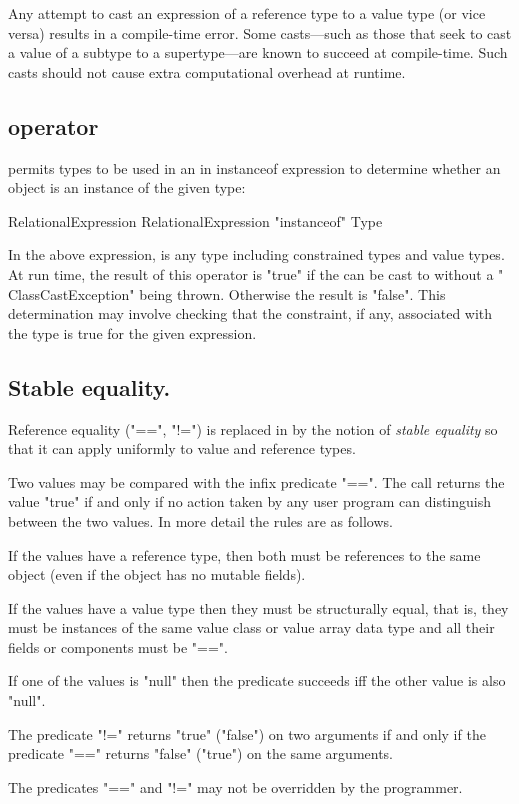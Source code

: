 Any attempt to cast an expression of a reference type to a value type
(or vice versa) results in a compile-time error. Some casts---such as
those that seek to cast a value of a subtype to a supertype---are
known to succeed at compile-time. Such casts should not cause extra
computational overhead at runtime.

\subsection{ operator}\label{instanceOf}

\Xten{} permits types to be used in an in instanceof expression
to determine whether an object is an instance of the given type:

\begin{grammar}
RelationalExpression \: RelationalExpression \xcd"instanceof" Type
\end{grammar}

In the above expression,  is any type including
constrained types and value types. 
At run time, the result of this operator is
\xcd"true" if the  can be cast
to  without a \xcd" ClassCastException" being
thrown.  Otherwise the result is \xcd"false".
This determination may involve checking
that the
constraint, if any, associated with the type is true for the
given expression.


\subsection{Stable equality.}\label{StableEquality}\index{==}\index{!=}

Reference equality (\xcd"==", \xcd"!=") is replaced in \Xten{} by the
notion of {\em stable equality} so that it can apply uniformly to value and
reference types.

Two values may be compared with the infix predicate \xcd"==". The call
returns the value \xcd"true" if and only if no action taken by any
user program can distinguish between the two values.  In more detail
the rules are as follows.

If the values have a reference type, then both must be references to
the same object (even if the object has no mutable fields). 

If the values have a value type then they must be structurally equal,
that is, they must be instances of the same value class or value array
data type and all their fields or components must be \xcd"==". 

If one of the values is \xcd"null" then the predicate succeeds iff the
other value is also \xcd"null".

The predicate \xcd"!=" returns \xcd"true" (\xcd"false") on two
arguments if and only if the predicate \xcd"==" returns \xcd"false"
(\xcd"true") on the same arguments.

The predicates \xcd"==" and \xcd"!=" may not be overridden by the
programmer.

